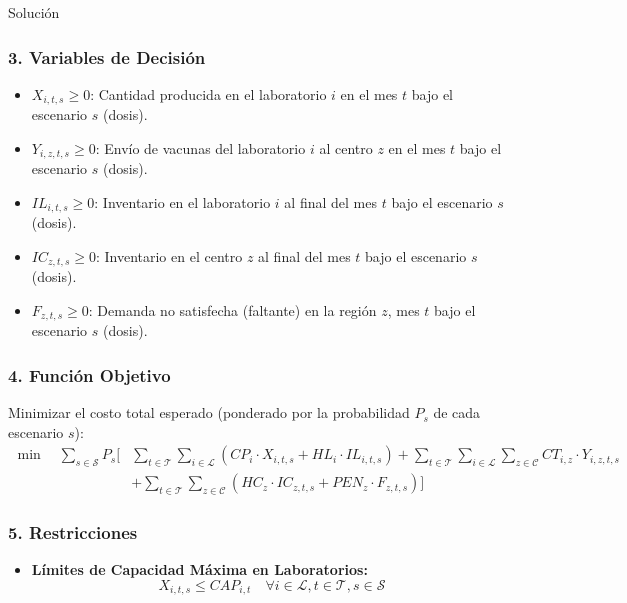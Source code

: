 \documentclass[11pt, a4paper]{article}
\begin{document}
\begin{ejercicio}{Solución}
  \subsubsection*{3. Variables de Decisión}
  \begin{itemize}
    \item $X_{i,t,s} \ge 0$: Cantidad producida en el laboratorio $i$ en el mes $t$ bajo el escenario $s$ (dosis).
    \item $Y_{i,z,t,s} \ge 0$: Envío de vacunas del laboratorio $i$ al centro $z$ en el mes $t$ bajo el escenario $s$ (dosis).
    \item $IL_{i,t,s} \ge 0$: Inventario en el laboratorio $i$ al final del mes $t$ bajo el escenario $s$ (dosis).
    \item $IC_{z,t,s} \ge 0$: Inventario en el centro $z$ al final del mes $t$ bajo el escenario $s$ (dosis).
    \item $F_{z,t,s} \ge 0$: Demanda no satisfecha (faltante) en la región $z$, mes $t$ bajo el escenario $s$ (dosis).
  \end{itemize}

  \subsubsection*{4. Función Objetivo}
  Minimizar el costo total esperado (ponderado por la probabilidad $P_s$ de cada escenario $s$):
  \begin{equation*}
    \begin{aligned}
      \min \quad \sum_{s \in \mathcal{S}} P_s \bigg[ &\sum_{t \in \mathcal{T}} \sum_{i \in \mathcal{L}} \left( CP_i \cdot X_{i,t,s} + HL_i \cdot IL_{i,t,s} \right) + \sum_{t \in \mathcal{T}} \sum_{i \in \mathcal{L}} \sum_{z \in \mathcal{C}} CT_{i,z} \cdot Y_{i,z,t,s} \\
      &+ \sum_{t \in \mathcal{T}} \sum_{z \in \mathcal{C}} \left( HC_z \cdot IC_{z,t,s} + PEN_z \cdot F_{z,t,s} \right) \bigg]
    \end{aligned}
  \end{equation*}

  \subsubsection*{5. Restricciones}
  \begin{itemize}
    \item \textbf{Límites de Capacidad Máxima en Laboratorios:}
    \begin{equation}
      X_{i,t,s} \le CAP_{i,t} \quad \forall i \in \mathcal{L}, t \in \mathcal{T}, s \in \mathcal{S}
    \end{equation}


\end{itemize}
\end{ejercicio}
\end{document}
